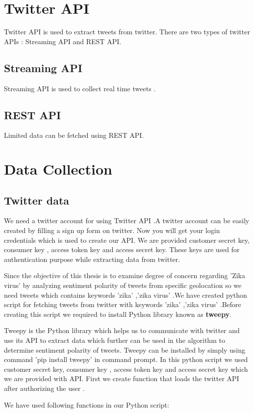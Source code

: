 \section{Twitter API}
Twitter API is used to extract tweets from twitter. There are two types of twitter APIs : Streaming API and REST API.
\subsection{Streaming API}
Streaming API is used to collect real time tweets .
\subsection{REST API}
Limited data can be fetched using REST API.
\section{Data Collection}
\subsection{Twitter data}
We need a twitter account for using Twitter API .A twitter account can be easily created by filling a sign up form on twitter. Now you will get your login credentials which is used to create our API. We are provided customer secret key, consumer key , access token key and access secret key. These keys are used for authentication purpose while extracting data from twitter.
\par Since the objective of this thesis is to examine degree of concern regarding 'Zika virus' by analyzing sentiment polarity of tweets from specific geolocation  so we need tweets which contains keywords 'zika' ,'zika virus' .We have created  python script for fetching tweets from  twitter with keywords 'zika' ,'zika virus' .Before creating this script we required to install Python library known as  {\bf tweepy}.
\par Tweepy is the Python library which helps us to communicate with twitter and use its API to  extract data which further can be used in the algorithm to determine sentiment polarity of tweets. Tweepy can be installed by simply using command 'pip install tweepy' in command prompt.
In this python script we used  customer secret key, consumer key , access token key and access secret key which we are provided with API. First we create function that loads the twitter API after authorizing the user .
\par We have used following functions in our Python script:\\

